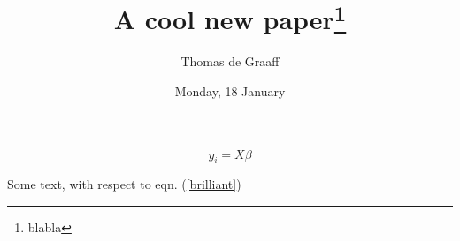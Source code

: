 \documentclass[]{article}
\title{A cool new paper\footnote{blabla}}
\author{Thomas de Graaff}
\date{Monday, 18 January}
\begin{document}
\maketitle

\begin{abstract}

\end{abstract}

\section{}

\begin{equation}
	y_i = X \beta
	\label{brilliant}
\end{equation}

Some text, with respect to eqn. (\ref{brilliant})
\cite{Ballester2010}
\cite{Akcomak2012}


\end{document}
